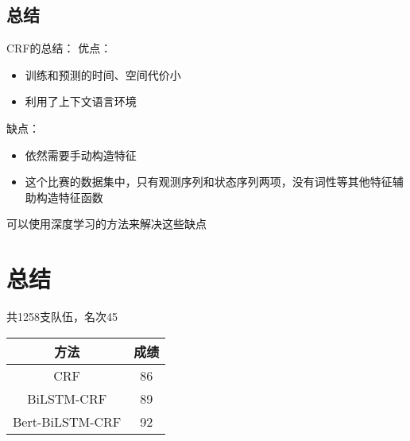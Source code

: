 \documentclass[9pt,aspectratio=169]{ctexbeamer}
\begin{document}
	\subsection{总结}
	\begin{frame}
		CRF的总结：
		优点：
		\begin{itemize}
			\item 训练和预测的时间、空间代价小
			\item 利用了上下文语言环境
		\end{itemize}
		缺点：
		\begin{itemize}
			\item 依然需要手动构造特征
			\item 这个比赛的数据集中，只有观测序列和状态序列两项，没有词性等其他特征辅助构造特征函数
		\end{itemize}
		可以使用深度学习的方法来解决这些缺点
	\end{frame}
	
%

	\section{总结}
	\begin{frame}
		共1258支队伍，名次45
		\begin{table}[]
			\begin{tabular}{cc}
				\hline
				方法               & 成绩   \\
				\hline
				CRF         & 86 \\
				BiLSTM-CRF         & 89               \\
				Bert-BiLSTM-CRF          & 92                              \\
				\hline
				
			\end{tabular}
		\end{table}
	\end{frame}
\end{document}

